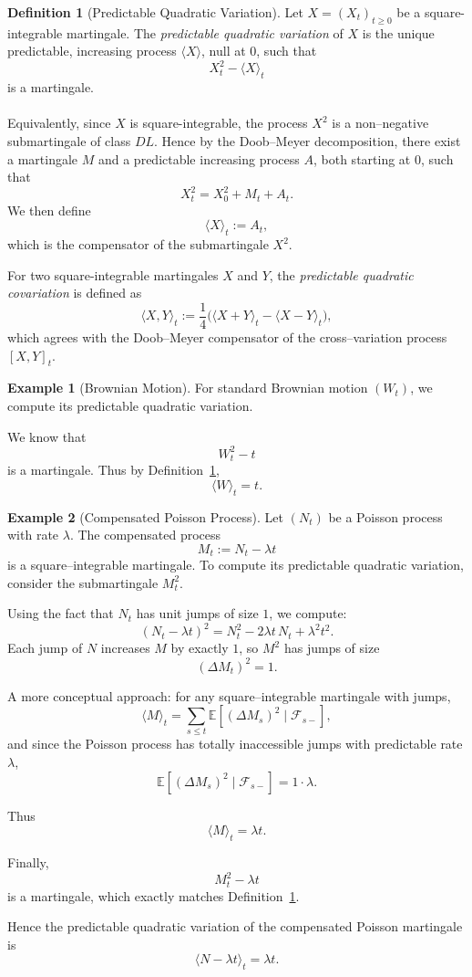 \documentclass[11pt,a4paper]{article}
\theoremstyle{definition}
\newtheorem{definition}{Definition}[section]
\newtheorem{example}{Example}[section]
\begin{document}
\begin{definition}[Predictable Quadratic Variation]\label{def:predictable_qv}
Let $X=(X_t)_{t\ge0}$ be a square-integrable martingale.  
The \emph{predictable quadratic variation} of $X$ is the unique predictable, increasing process $\langle X\rangle$, null at $0$, such that
\[
    X_t^2 - \langle X\rangle_t
\]
is a martingale.
~\\~\\
Equivalently, since $X$ is square-integrable, the process $X^2$ is a non–negative submartingale of class $DL$.  
Hence by the Doob--Meyer decomposition, there exist a martingale $M$ and a predictable increasing process $A$, both starting at $0$, such that
\[
    X_t^2 = X_0^2 + M_t + A_t.
\]
We then define
\[
    \langle X\rangle_t := A_t,
\]
which is the compensator of the submartingale $X^2$.

\vspace{0.2cm}
\noindent
For two square-integrable martingales $X$ and $Y$, the \emph{predictable quadratic covariation} is defined as
\[
    \langle X,Y\rangle_t
    := \frac{1}{4}\Big(
            \langle X+Y\rangle_t
            - \langle X-Y\rangle_t
        \Big),
\]
which agrees with the Doob--Meyer compensator of the cross–variation process
\(
[X,Y]_t.
\)
\end{definition}

\begin{example}[Brownian Motion]\label{ex:qv_bm}
For standard Brownian motion $(W_t)$, we compute its predictable quadratic variation.

We know that
\[
    W_t^2 - t
\]
is a martingale.  
Thus by Definition~\ref{def:predictable_qv},
\[
    \langle W\rangle_t = t.
\]
\end{example}

\begin{example}[Compensated Poisson Process]\label{ex:qv_poisson}
Let $(N_t)$ be a Poisson process with rate $\lambda$.  
The compensated process
\[
    M_t := N_t - \lambda t
\]
is a square–integrable martingale.  
To compute its predictable quadratic variation, consider the submartingale $M_t^2$.

Using the fact that $N_t$ has unit jumps of size $1$, we compute:
\[
    (N_t - \lambda t)^2
        = N_t^2 - 2\lambda t\, N_t + \lambda^2 t^2.
\]
Each jump of $N$ increases $M$ by exactly $1$, so $M^2$ has jumps of size
\[
    (\Delta M_t)^2 = 1.
\]

A more conceptual approach:  
for any square–integrable martingale with jumps,
\[
    \langle M\rangle_t = \sum_{s\le t} \mathbb{E}[(\Delta M_s)^2 \mid \mathcal{F}_{s-}],
\]
and since the Poisson process has totally inaccessible jumps with predictable rate $\lambda$,
\[
    \mathbb{E}[(\Delta M_s)^2 \mid \mathcal{F}_{s-}] = 1 \cdot \lambda.
\]

Thus
\[
    \langle M\rangle_t = \lambda t.
\]

Finally,
\[
    M_t^2 - \lambda t
\]
is a martingale, which exactly matches Definition~\ref{def:predictable_qv}.

Hence the predictable quadratic variation of the compensated Poisson martingale is
\[
    \langle N - \lambda t\rangle_t = \lambda t.
\]
\end{example}
\end{document}
